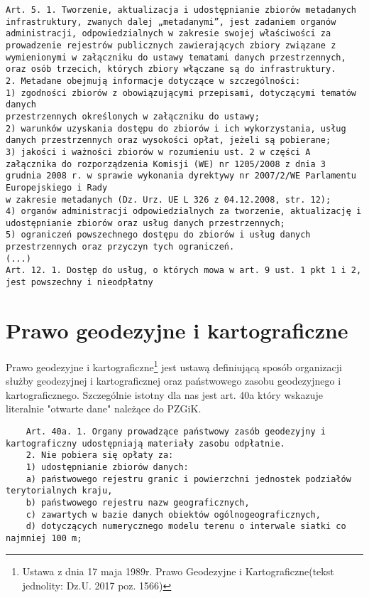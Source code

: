 \begin{lstlisting}
Art. 5. 1. Tworzenie, aktualizacja i udostępnianie zbiorów metadanych infrastruktury, zwanych dalej „metadanymi”, jest zadaniem organów administracji, odpowiedzialnych w zakresie swojej właściwości za prowadzenie rejestrów publicznych zawierających zbiory związane z wymienionymi w załączniku do ustawy tematami danych przestrzennych, oraz osób trzecich, których zbiory włączane są do infrastruktury.
2. Metadane obejmują informacje dotyczące w szczególności:
1) zgodności zbiorów z obowiązującymi przepisami, dotyczącymi tematów danych
przestrzennych określonych w załączniku do ustawy;
2) warunków uzyskania dostępu do zbiorów i ich wykorzystania, usług danych przestrzennych oraz wysokości opłat, jeżeli są pobierane;
3) jakości i ważności zbiorów w rozumieniu ust. 2 w części A załącznika do rozporządzenia Komisji (WE) nr 1205/2008 z dnia 3 grudnia 2008 r. w sprawie wykonania dyrektywy nr 2007/2/WE Parlamentu Europejskiego i Rady
w zakresie metadanych (Dz. Urz. UE L 326 z 04.12.2008, str. 12);
4) organów administracji odpowiedzialnych za tworzenie, aktualizację i udostępnianie zbiorów oraz usług danych przestrzennych;
5) ograniczeń powszechnego dostępu do zbiorów i usług danych przestrzennych oraz przyczyn tych ograniczeń.	
(...)
Art. 12. 1. Dostęp do usług, o których mowa w art. 9 ust. 1 pkt 1 i 2, jest powszechny i nieodpłatny
\end{lstlisting}

\section{Prawo geodezyjne i kartograficzne}
Prawo geodezyjne i kartograficzne\footnote{Ustawa z dnia 17 maja 1989r. Prawo Geodezyjne i Kartograficzne(tekst jednolity: Dz.U. 2017 poz. 1566)} jest ustawą definiującą sposób organizacji służby geodezyjnej i kartograficznej oraz państwowego zasobu geodezyjnego i kartograficznego. Szczególnie istotny dla nas jest art. 40a który wskazuje literalnie "otwarte dane" należące do PZGiK.

\begin{lstlisting}
	Art. 40a. 1. Organy prowadzące państwowy zasób geodezyjny i kartograficzny udostępniają materiały zasobu odpłatnie.
	2. Nie pobiera się opłaty za:
	1) udostępnianie zbiorów danych:
	a) państwowego rejestru granic i powierzchni jednostek podziałów terytorialnych kraju,
	b) państwowego rejestru nazw geograficznych,
	c) zawartych w bazie danych obiektów ogólnogeograficznych,
	d) dotyczących numerycznego modelu terenu o interwale siatki co najmniej 100 m;
\end{lstlisting}

